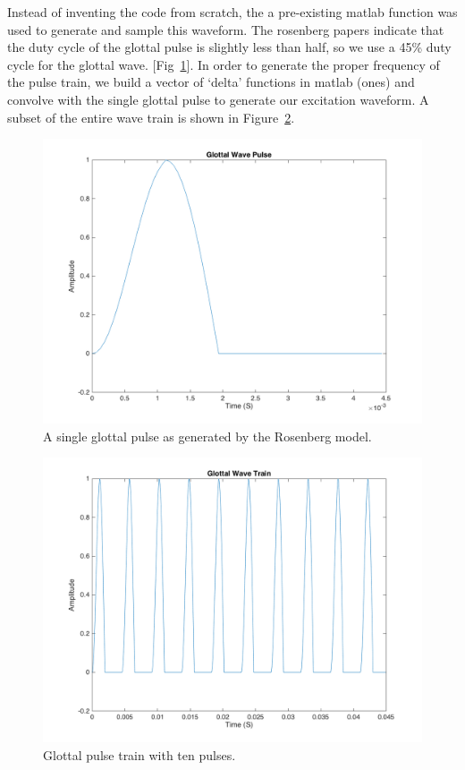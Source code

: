 \documentclass{article}
\begin{document}
Instead of inventing the code from scratch, the a pre-existing matlab function was used to generate and sample this waveform. The rosenberg papers indicate that the duty cycle of the glottal pulse is slightly less than half, so we use a 45\% duty cycle for the glottal wave. [Fig~\ref{fig:glottal_wave_pulse}]. In order to generate the proper frequency of the pulse train, we build a vector of `delta' functions in matlab (ones) and convolve with the single glottal pulse to generate our excitation waveform. A subset of the entire wave train is shown in Figure~\ref{fig:glottal_wave_train}. 
\begin{figure}[h]
  \centering
    \includegraphics[width=.4\textheight]{glottal_wave_pulse.png}
  \caption{A single glottal pulse as generated by the Rosenberg model.}
  \label{fig:glottal_wave_pulse}
\end{figure}
\begin{figure}[h]
  \centering
    \includegraphics[width=.4\textheight]{glottal_wave_train.png}
  \caption{Glottal pulse train with ten pulses.}
  \label{fig:glottal_wave_train}
\end{figure}
\end{document}
